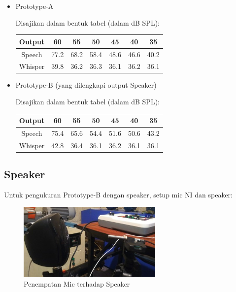 \documentclass[12pt,]{article}
\begin{document}
	\begin{itemize}
		\item Prototype-A
		
		Disajikan dalam bentuk tabel (dalam dB SPL):
		\begin{center}
			\begin{tabular}{|c|c|c|c|c|c|c|}
				\hline
				Output & 60 & 55 & 50 & 45 & 40 & 35\\ [0.5ex]
				\hline\hline
				Speech & 77.2 & 68.2 & 58.4 & 48.6 & 46.6 & 40.2 \\
				\hline
				Whisper & 39.8 & 36.2 & 36.3 & 36.1 & 36.2 & 36.1 \\
				\hline
			\end{tabular}
		\end{center}

		\item Prototype-B (yang dilengkapi output Speaker)
		
		Disajikan dalam bentuk tabel (dalam dB SPL):
		\begin{center}
			\begin{tabular}{|c|c|c|c|c|c|c|}
				\hline
				Output & 60 & 55 & 50 & 45 & 40 & 35\\ [0.5ex]
				\hline\hline
				Speech & 75.4 & 65.6 & 54.4 & 51.6 & 50.6 & 43.2 \\
				\hline
				Whisper & 42.8 & 36.4 & 36.1 & 36.2 & 36.1 & 36.1 \\
				\hline
			\end{tabular}
		\end{center}
	\end{itemize}

	\subsection{Speaker}
	Untuk pengukuran Prototype-B dengan speaker, setup mic NI dan speaker:
	
	\begin{figure}[!ht]
		\centering
		\includegraphics[width=200pt]{images/ukur_speaker}
		\caption{Penempatan Mic terhadap Speaker}
	\end{figure}
\end{document}
